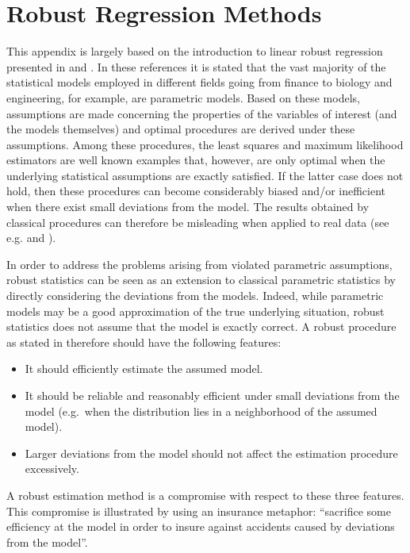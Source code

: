 \documentclass[]{book}
\providecommand{\tightlist}{%
  \setlength{\itemsep}{0pt}\setlength{\parskip}{0pt}}
\theoremstyle{definition}
\theoremstyle{definition}
\theoremstyle{definition}
\theoremstyle{remark}
\begin{document}
{{\chapter{Robust Regression Methods}\label{appendixb}}

This appendix is largely based on the introduction to linear robust
regression presented in \citet{ronchetti2006historical} and
\citet{duncan2016ela}. In these references it is stated that the vast
majority of the statistical models employed in different fields going
from finance to biology and engineering, for example, are parametric
models. Based on these models, assumptions are made concerning the
properties of the variables of interest (and the models themselves) and
optimal procedures are derived under these assumptions. Among these
procedures, the least squares and maximum likelihood estimators are well
known examples that, however, are only optimal when the underlying
statistical assumptions are exactly satisfied. If the latter case does
not hold, then these procedures can become considerably biased and/or
inefficient when there exist small deviations from the model. The
results obtained by classical procedures can therefore be misleading
when applied to real data (see e.g. \citet{ronchetti2006historical} and
\citet{huber2009robust}).

In order to address the problems arising from violated parametric
assumptions, robust statistics can be seen as an extension to classical
parametric statistics by directly considering the deviations from the
models. Indeed, while parametric models may be a good approximation of
the true underlying situation, robust statistics does not assume that
the model is exactly correct. A robust procedure as stated in
\citet{huber2009robust} therefore should have the following features:

\begin{itemize}
\tightlist
\item
  It should efficiently estimate the assumed model.
\item
  It should be reliable and reasonably efficient under small deviations
  from the model (e.g.~when the distribution lies in a neighborhood of
  the assumed model).
\item
  Larger deviations from the model should not affect the estimation
  procedure excessively.
\end{itemize}

A robust estimation method is a compromise with respect to these three
features. This compromise is illustrated by
\citet{anscombe1960rejection} using an insurance metaphor: ``sacrifice
some efficiency at the model in order to insure against accidents caused
by deviations from the model''.

}
\end{document}
